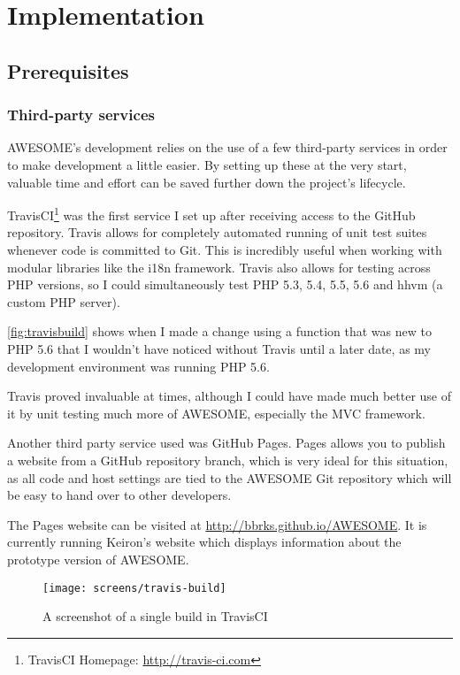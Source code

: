 \chapter{Implementation}

	\section{Prerequisites}
	\label{sec:prerequisitesimp}
	
	\subsection{Third-party services}
	\label{ssec:third-party-services}
	
	\ac{AWESOME}'s development relies on the use of a few third-party services in order to make development a little easier.
	By setting up these at the very start, valuable time and effort can be saved further down the project's lifecycle.
	
	TravisCI\footnote{TravisCI Homepage: \url{http://travis-ci.com}} was the first service I set up after receiving access to the GitHub repository.
	Travis allows for completely automated running of unit test suites whenever code is committed to Git.
	This is incredibly useful when working with modular libraries like the \ac{i18n} framework.
	Travis also allows for testing across PHP versions, so I could simultaneously test PHP 5.3, 5.4, 5.5, 5.6 and hhvm (a custom PHP server).
	
	\autoref{fig:travisbuild} shows when I made a change using a function that was new to PHP 5.6 that I wouldn't have noticed without Travis until a later date, as my development environment was running PHP 5.6.
	
	Travis proved invaluable at times, although I could have made much better use of it by unit testing much more of \ac{AWESOME}, especially the \ac{MVC} framework.
	
	Another third party service used was GitHub Pages.
	Pages allows you to publish a website from a GitHub repository branch, which is very ideal for this situation, as all code and host settings are tied to the \ac{AWESOME} Git repository which will be easy to hand over to other developers.
	
	The Pages website can be visited at \url{http://bbrks.github.io/AWESOME}.
	It is currently running Keiron's website which displays information about the prototype version of \ac{AWESOME}.
	
	\begin{figure}[H]
		\centering \texttt{[image: screens/travis-build]}
		\caption{A screenshot of a single build in TravisCI}
		\label{fig:travisbuild}
	\end{figure}
	
